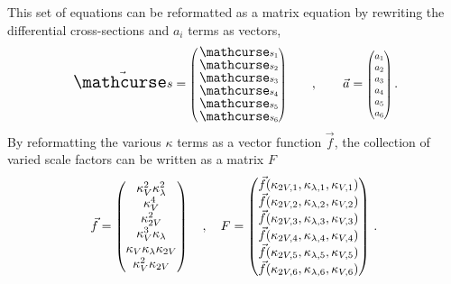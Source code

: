    This set of equations can be reformatted as a matrix equation
        by rewriting the differential cross-sections and $a_i$ terms as vectors,
    \begin{equation}
        \vec{\xsec} = \minimatrix{ \xsec_{1} \\ \xsec_{2} \\ \xsec_{3} \\ \xsec_{4} \\ \xsec_{5} \\ \xsec_{6} }
        \qquad,\qquad
        \vec{a} = \minimatrix{ a_1 \\ a_2 \\ a_3 \\ a_4 \\ a_5 \\ a_6 }
        \,.
    \end{equation}
    By reformatting the various $\kappa$ terms as a vector function $\vec{f}$,
        the collection of varied scale factors can be written as a matrix $F$
    \begin{equation}
        \vec{f} = \begin{pmatrix} \kappa_{V}^2 \kappa_{\lambda}^2 \\ \kappa_{V}^4 \\ \kappa_{2V}^2 \\ \kappa_{V}^3 \kappa_{\lambda} \\ \kappa_{V} \kappa_{\lambda} \kappa_{2V} \\ \kappa_{V}^2 \kappa_{2V} \end{pmatrix}
        \quad,\quad
        F = \begin{pmatrix}
            \vec{f}(\kappa_{2V,1}, \kappa_{\lambda,1}, \kappa_{V,1}) \\
            \vec{f}(\kappa_{2V,2}, \kappa_{\lambda,2}, \kappa_{V,2}) \\
            \vec{f}(\kappa_{2V,3}, \kappa_{\lambda,3}, \kappa_{V,3}) \\
            \vec{f}(\kappa_{2V,4}, \kappa_{\lambda,4}, \kappa_{V,4}) \\
            \vec{f}(\kappa_{2V,5}, \kappa_{\lambda,5}, \kappa_{V,5}) \\
            \vec{f}(\kappa_{2V,6}, \kappa_{\lambda,6}, \kappa_{V,6}) \\
        \end{pmatrix}
        \,.
    \end{equation}

